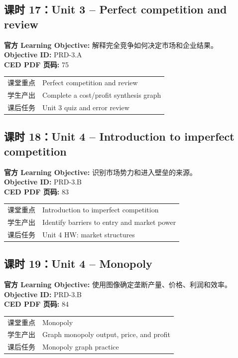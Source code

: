 \documentclass[11pt,a4paper]{ctexart}
\newcommand{\objectivebox}[1]{\noindent\colorbox{aplight}{\parbox{0.96\textwidth}{#1}}}
\begin{document}
\subsection{课时 17：Unit 3 -- Perfect competition and review}
\objectivebox{\textbf{官方 Learning Objective:} 解释完全竞争如何决定市场和企业结果。\\\textbf{Objective ID:} PRD-3.A\\\textbf{CED PDF 页码:} 75}\par\vspace{0.4em}
\begin{tabularx}{\textwidth}{p{3.0cm}Y}
\toprule
课堂重点 & Perfect competition and review\\
学生产出 & Complete a cost/profit synthesis graph\\
课后任务 & Unit 3 quiz and error review\\
\bottomrule
\end{tabularx}
\subsection{课时 18：Unit 4 -- Introduction to imperfect competition}
\objectivebox{\textbf{官方 Learning Objective:} 识别市场势力和进入壁垒的来源。\\\textbf{Objective ID:} PRD-3.B\\\textbf{CED PDF 页码:} 83}\par\vspace{0.4em}
\begin{tabularx}{\textwidth}{p{3.0cm}Y}
\toprule
课堂重点 & Introduction to imperfect competition\\
学生产出 & Identify barriers to entry and market power\\
课后任务 & Unit 4 HW: market structures\\
\bottomrule
\end{tabularx}
\newpage
\subsection{课时 19：Unit 4 -- Monopoly}
\objectivebox{\textbf{官方 Learning Objective:} 使用图像确定垄断产量、价格、利润和效率。\\\textbf{Objective ID:} PRD-3.B\\\textbf{CED PDF 页码:} 84}\par\vspace{0.4em}
\begin{tabularx}{\textwidth}{p{3.0cm}Y}
\toprule
课堂重点 & Monopoly\\
学生产出 & Graph monopoly output, price, and profit\\
课后任务 & Monopoly graph practice\\
\bottomrule
\end{tabularx}
\end{document}
